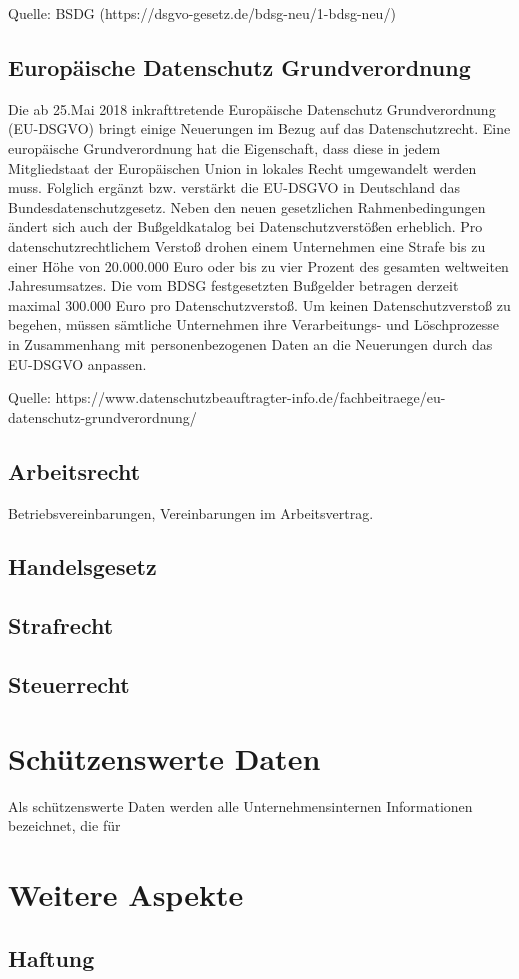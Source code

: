 Quelle: BSDG (https://dsgvo-gesetz.de/bdsg-neu/1-bdsg-neu/)

\subsection{Europäische Datenschutz Grundverordnung}
Die ab 25.Mai 2018 inkrafttretende Europäische Datenschutz Grundverordnung (EU-DSGVO) bringt einige Neuerungen im Bezug auf das Datenschutzrecht. Eine europäische Grundverordnung hat die Eigenschaft, dass diese in jedem Mitgliedstaat der Europäischen Union in lokales Recht umgewandelt werden muss. Folglich ergänzt bzw. verstärkt die EU-DSGVO in Deutschland das Bundesdatenschutzgesetz. Neben den neuen gesetzlichen Rahmenbedingungen ändert sich auch der Bußgeldkatalog bei Datenschutzverstößen erheblich. Pro datenschutzrechtlichem Verstoß drohen einem Unternehmen eine Strafe bis zu einer Höhe von 20.000.000 Euro oder bis zu vier Prozent des gesamten weltweiten Jahresumsatzes. Die vom BDSG festgesetzten Bußgelder betragen derzeit maximal 300.000 Euro pro Datenschutzverstoß.  Um keinen Datenschutzverstoß zu begehen, müssen sämtliche Unternehmen ihre Verarbeitungs- und Löschprozesse in Zusammenhang mit personenbezogenen Daten an die Neuerungen durch das EU-DSGVO anpassen. 

Quelle: https://www.datenschutzbeauftragter-info.de/fachbeitraege/eu-datenschutz-grundverordnung/

\subsection{Arbeitsrecht}
Betriebsvereinbarungen, Vereinbarungen im Arbeitsvertrag. 
\subsection{Handelsgesetz}
\subsection{Strafrecht}
\subsection{Steuerrecht}
\section {Schützenswerte Daten}

Als schützenswerte Daten werden alle Unternehmensinternen Informationen bezeichnet, die für 



\section {Weitere Aspekte}

\subsection{Haftung}













